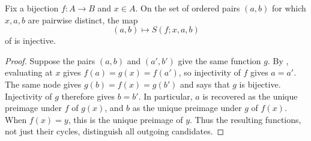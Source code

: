 \begin{lemma}
Fix a bijection $f:A\to B$ and $x\in A$. On the set of ordered pairs
$(a,b)$ for which $x,a,b$ are pairwise distinct, the map
\[
(a,b)\longmapsto S(f;x,a,b)
\]
of  is injective.
\end{lemma}
\begin{proof}
Suppose the pairs $(a,b)$ and $(a',b')$ give the same function $g$.
By , evaluating at $x$ gives
$f(a)=g(x)=f(a')$, so injectivity of $f$ gives $a=a'$.
The same node gives $g(b)=f(x)=g(b')$ and says that $g$ is bijective.
Injectivity of $g$ therefore gives $b=b'$. In particular, $a$ is
recovered as the unique preimage under $f$ of $g(x)$, and $b$ as the
unique preimage under $g$ of $f(x)$. When $f(x)=y$, this is the unique
preimage of $y$. Thus the resulting functions, not just their cycles,
distinguish all outgoing candidates.
\end{proof}
